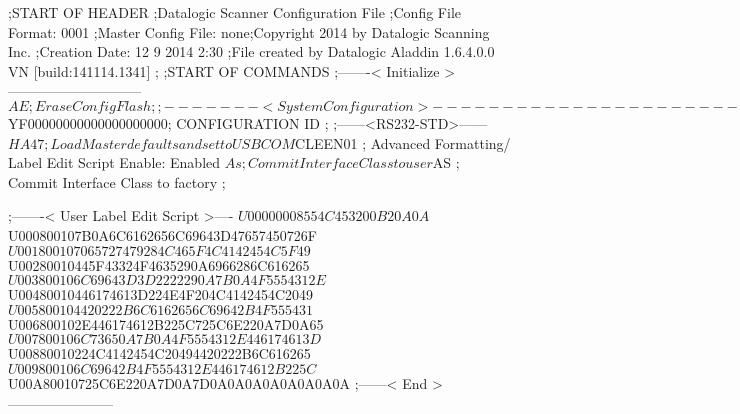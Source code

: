 ;START OF HEADER
;Datalogic Scanner Configuration File
;Config File Format: 0001
;Master Config File: none;Copyright 2014 by Datalogic Scanning Inc.
;Creation Date: 12 9 2014 2:30
;File created by Datalogic Aladdin 1.6.4.0.0 VN [build:141114.1341]
;
;START OF COMMANDS
;-------< Initialize >-----------------------------
$AE                 ; Erase Config Flash
;
;-------< System Configuration >-------------------------------
$YF00000000000000000000; CONFIGURATION ID
;
;------<RS232-STD>------
$HA47               ; Load Master defaults and set to USBCOM
$CLEEN01            ; Advanced Formatting/ Label Edit Script Enable: Enabled
$As                 ; Commit Interface Class to user
$AS                 ; Commit Interface Class to factory
;

;-------< User Label Edit Script >----
$U00000008554C453200B20A0A
$U000800107B0A6C6162656C69643D47657450726F
$U001800107065727479284C465F4C4142454C5F49
$U00280010445F43324F4635290A6966286C616265
$U003800106C69643D3D2222290A7B0A4F5554312E
$U00480010446174613D224E4F204C4142454C2049
$U005800104420222B6C6162656C69642B4F555431
$U006800102E446174612B225C725C6E220A7D0A65
$U007800106C73650A7B0A4F5554312E446174613D
$U00880010224C4142454C20494420222B6C616265
$U009800106C69642B4F5554312E446174612B225C
$U00A80010725C6E220A7D0A7D0A0A0A0A0A0A0A0A
;------< End >-----------------------
